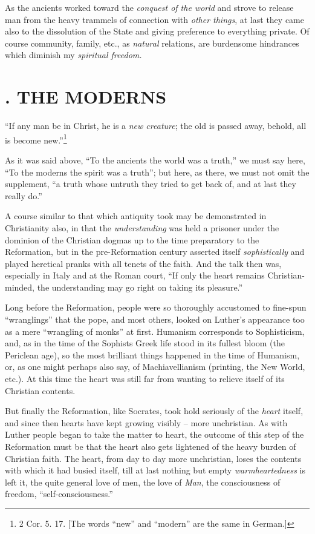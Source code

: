 As the ancients worked toward the \textit{conquest of the world} and strove to 
release man from the heavy trammels of connection with \textit{other things}, 
at last they came also to the dissolution of the State and giving preference 
to everything private. Of course community, family, etc., as \textit{natural} 
relations, are burdensome hindrances which diminish my \textit{spiritual 
freedom.}

\medskip{}

\section[2. The Moderns]{. THE MODERNS}

``If any man be in Christ, he is a \textit{new creature}; the old is passed 
away, behold, all is become new.''\footnote{2 Cor. 5. 17. [The words 
``new'' and ``modern'' are the same in German.]}

As it was said above, ``To the ancients the world was a truth,'' we must say 
here, ``To the moderns the spirit was a truth''; but here, as there, we must 
not omit the supplement, ``a truth whose untruth they tried to get back of, 
and at last they really do.''

A course similar to that which antiquity took may be demonstrated in 
Christianity also, in that the \textit{understanding} was held a prisoner 
under the dominion of the Christian dogmas up to the time preparatory to the 
Reformation, but in the pre-Reformation century asserted itself 
\textit{sophistically} and played heretical pranks with all tenets of the 
faith. And the talk then was, especially in Italy and at the Roman court, 
``If only the heart remains Christian-minded, the understanding may go right 
on taking its pleasure.''

Long before the Reformation, people were so thoroughly accustomed to fine-spun 
``wranglings'' that the pope, and most others, looked on Luther's appearance 
too as a mere ``wrangling of monks'' at first. Humanism corresponds to 
Sophisticism, and, as in the time of the Sophists Greek life stood in its 
fullest bloom (the Periclean age), so the most brilliant things happened in 
the time of Humanism, or, as one might perhaps also say, of Machiavellianism 
(printing, the New World, etc.). At this time the heart was still far from 
wanting to relieve itself of its Christian contents.

But finally the Reformation, like Socrates, took hold seriously of the 
\textit{heart} itself, and since then hearts have kept growing visibly -- more 
unchristian. As with Luther people began to take the matter to heart, the 
outcome of this step of the Reformation must be that the heart also gets 
lightened of the heavy burden of Christian faith. The heart, from day to day 
more unchristian, loses the contents with which it had busied itself, till at 
last nothing but empty \textit{warmheartedness} is left it, the quite general 
love of men, the love of \textit{Man}, the consciousness of freedom, 
``self-consciousness.''

